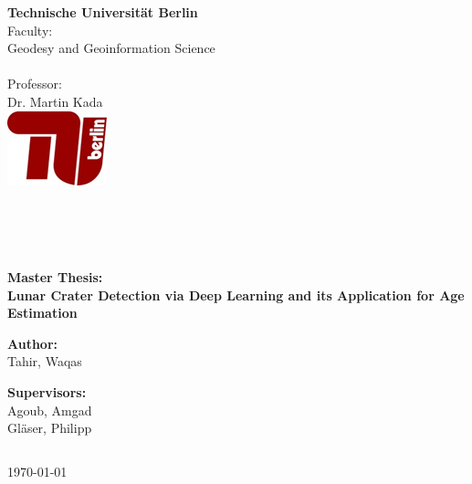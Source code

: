 \documentclass[11pt]{article}
\begin{document}
\sloppy

\begin{titlepage}
	\begin{multicols}{2} 
		\textbf {Technische Universit\"{a}t Berlin}\\
		Faculty:            \\ Geodesy and Geoinformation Science\\  \\
		Professor: \\
		Dr. Martin Kada\\
		\columnbreak
		\flushright
		\includegraphics{files/TU} 
	\end{multicols}

	\vspace{0.1\textheight}
	
	\begin{verbatim}
 
 
 
	\end{verbatim}
	\begin{center}
		\textbf{\Large{Master Thesis: \\[1 cm] Lunar Crater Detection via Deep Learning and its Application for Age Estimation}}
	\end{center}
	\vspace{0.25\textheight}
	\begin{center}
		\vspace{0.7cm}
		\textbf{Author:}\\
		Tahir, Waqas \\
	\end{center}
	\begin{center}	
		\textbf{Supervisors:}\\
		Agoub, Amgad\\
		Gläser, Philipp
	\end{center}
	\begin{verbatim}
	\end{verbatim}
	\begin{center}
		\today
	\end{center}

\end{titlepage}

\newpage 
\end{document}
